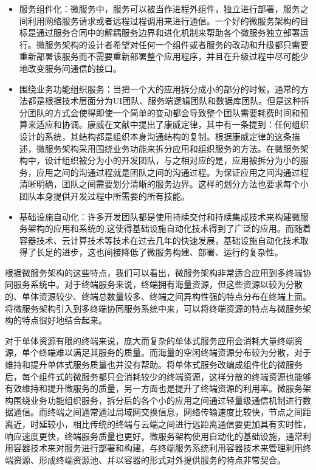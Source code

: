 \begin{itemize}
    \item 服务组件化：微服务中，服务可以被当作进程外组件，独立进行部署，服务之间利用网络服务请求或者远程过程调用来进行通信。一个好的微服务架构的目标是通过服务合同中的解耦服务边界和进化机制来帮助各个微服务独立部署运行。微服务架构的设计者希望对任何一个组件或者服务的改动和升级都只需要重新部署该服务而不需要重新部署整个应用程序，并且在升级过程中尽可能少地改变服务间通信的接口。
    \item 围绕业务功能组织服务：当把一个大的应用拆分成小的部分的时候，通常的方法都是根据技术层面分为UI团队、服务端逻辑团队和数据库团队。但是这种拆分团队的方式会使得即使一个简单的变动都会导致整个团队需要耗费时间和预算来适应和协调。康威在文献\cite{conway1968committees}中提出了康威定律，其中有一条提到：任何组织设计的系统，其结构都是组织本身沟通结构的复制。根据康威定律的这条描述，微服务架构采用围绕业务功能来拆分应用和组织服务的方法。在微服务架构中，设计组织被分为小的开发团队，与之相对应的是，应用被拆分为小的服务，应用之间的沟通过程就是团队之间的沟通过程。为保证应用之间沟通过程清晰明确，团队之间需要划分清晰的服务边界。这样的划分方法也要求每个小团队本身提供开发过程中所需要的所有技能。
    \item 基础设施自动化：许多开发团队都是使用持续交付和持续集成技术来构建微服务架构的应用和系统的,这使得基础设施自动化技术得到了广泛的应用。而随着容器技术、云计算技术等技术在过去几年的快速发展，基础设施自动化技术取得了长足的进步，这也间接降低了微服务构建、部署、运行的复杂性。

\end{itemize}

根据微服务架构的这些特点，我们可以看出，微服务架构非常适合应用到多终端协同服务系统中。对于终端服务来说，终端拥有海量资源，但这些资源以较为分散的、单体资源较少、终端总数量较多、终端之间异构性强的特点分布在终端上面。将微服务架构引入到多终端协同服务系统中来，可以将终端资源的特点与微服务架构的特点很好地结合起来。

对于单体资源有限的终端来说，庞大而复杂的单体式服务应用会消耗大量终端资源，单个终端难以满足其服务的质量。而海量的空闲终端资源分布较为分散，对于维持和提升单体式服务质量也并没有帮助。将单体式服务改编成组件化的微服务后，每个组件式的微服务都只会消耗较少的终端资源，这样分散的终端资源也能够有效维持和提升微服务的质量，另一方面也是提升了终端资源的利用率。微服务架构围绕业务功能组织服务，拆分后的各个小的应用之间通过轻量级通信机制进行数据通信。而终端之间通常通过局域网交换信息，网络传输速度比较快，节点之间距离近，时延较小，相比传统的终端与云端之间进行远距离通信要更加具有实时性，响应速度更快，终端服务质量也更好。微服务架构使用自动化的基础设施，通常利用容器技术来对服务进行部署和构建，与终端服务系统利用容器技术来管理利用终端资源、形成终端资源池、并以容器的形式对外提供服务的特点非常契合。

